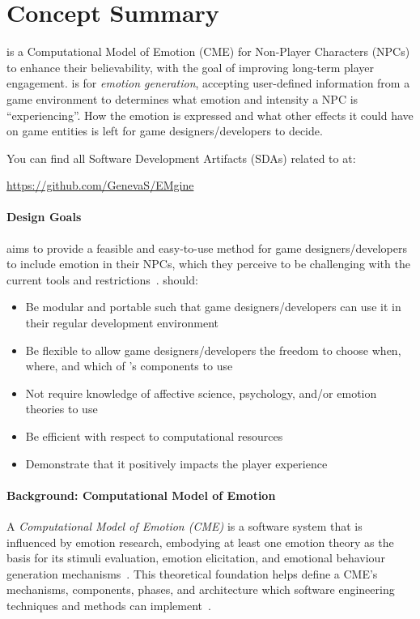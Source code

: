 \section{\progname{} Concept Summary}\label{appendix:concept}
\progname{} is a Computational Model of Emotion (CME) for Non-Player Characters
(NPCs) to enhance their believability, with the goal of improving long-term
player engagement. \progname{} is for \textit{emotion generation}, accepting
user-defined information from a game environment to determines what emotion and
intensity a NPC is ``experiencing''. How the emotion is expressed and what
other effects it could have on game entities is left for game
designers/developers to decide.

You can find all Software Development Artifacts (SDAs) related to \progname{}
at:
\begin{center}
    \url{https://github.com/GenevaS/EMgine}
\end{center}

\paragraph{Design Goals} \progname{} aims to provide a feasible and easy-to-use
method for game designers/developers to include emotion in their NPCs, which
they perceive to be challenging with the current tools and
restrictions~\citep{broekens2016emotional}. \progname{} should:
\begin{itemize}

    \item Be modular and portable such that game designers/developers can use
    it in their regular development environment

    \item Be flexible to allow game designers/developers the freedom to choose
    when, where, and which of \progname{}'s components to use

    \item Not require knowledge of affective science, psychology, and/or
    emotion theories to use

    \item Be efficient with respect to computational resources

    \item Demonstrate that it positively impacts the player experience

\end{itemize}

\paragraph{Background: Computational Model of Emotion} A \textit{Computational
Model of Emotion (CME)} is a software system that is influenced by emotion
research, embodying at least one emotion theory as the basis for its stimuli
evaluation, emotion elicitation, and emotional behaviour generation
mechanisms~\citep[p.~2, 14]{osuna2020seperspective}. This theoretical
foundation helps define a CME's mechanisms, components, phases, and
architecture which software engineering techniques and methods can
implement~\citep[p.~139]{osuna2021toward}.

